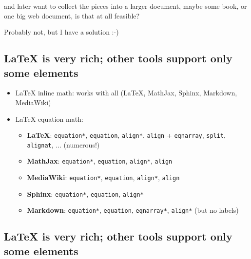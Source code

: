 \documentclass[%
oneside,                 %
final,                   %
10pt]{article}
\begin{document}
\noindent
and later want to collect the pieces into a larger document, maybe
some book, or one big web document, is that at all feasible?

Probably not, but I have a solution :-)


\subsection{{\LaTeX} is very rich; other tools support only some elements}

\begin{itemize}
 \item {\LaTeX} inline math: works with all ({\LaTeX}, MathJax, Sphinx, Markdown, MediaWiki)

 \item {\LaTeX} equation math:
\begin{itemize}

    \item \textbf{LaTeX}: \texttt{equation*}, \texttt{equation}, \texttt{align*}, \texttt{align} + \texttt{eqnarray}, \texttt{split}, \texttt{alignat}, ... (numerous!)

    \item \textbf{MathJax}: \texttt{equation*}, \texttt{equation}, \texttt{align*}, \texttt{align}

    \item \textbf{MediaWiki}: \texttt{equation*}, \texttt{equation}, \texttt{align*}, \texttt{align}

    \item \textbf{Sphinx}: \texttt{equation*}, \texttt{equation}, \texttt{align*}

    \item \textbf{Markdown}: \texttt{equation*}, \texttt{equation}, \texttt{eqnarray*}, \texttt{align*} (but no labels)
\end{itemize}

\noindent
\end{itemize}

\noindent
\subsection{{\LaTeX} is very rich; other tools support only some elements}
\end{document}
